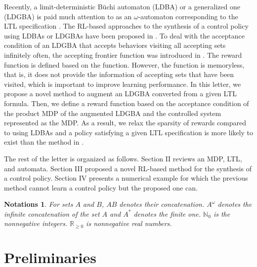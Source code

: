 \documentclass[letterpaper, 10 pt, conference]{ieeeconf}  %
\newtheorem{notations}{Notations}
\begin{document}
Recently, a limit-deterministic B\"{u}chi automaton (LDBA) or a generalized one (LDGBA) is paid much attention to as an $\omega$-automaton corresponding to the LTL specification \cite{SEJK2016}.
The RL-based approaches to the synthesis of a control policy using LDBAs or LDGBAs have been proposed in \cite{HAK2019,Hahn2019,HKAKPL2019,BWZP2019}.
To deal with the acceptance condition of an LDGBA that accepts behaviors visiting all accepting sets infinitely often, the accepting frontier function was introduced in \cite{HAK2019,HKAKPL2019}. The reward function is defined based on the function.
However, the function is memoryless, that is, it does not provide the information of accepting sets that have been visited, which is important to improve learning performance.
In this letter, we propose a novel method to augment an LDGBA converted from a given LTL formula.
Then, we define a reward function based on the acceptance condition of the product MDP of the augmented LDGBA and the controlled system represented as the MDP.
As a result, we relax the sparsity of rewards compared to using LDBAs and a policy satisfying a given LTL specification is more likely to exist than the method in \cite{HAK2019}.

The rest of the letter is organized as follows.
Section II reviews an MDP, LTL, and automata.
Section III proposed a novel RL-based method for the synthesis of a control policy.
Section IV presents a numerical example for which the previous method cannot learn a control policy but the proposed one can.

\begin{notations}
  For sets $A$ and $B$, $AB$ denotes their concatenation. $A^{\omega}$ denotes the infinite concatenation of the set $A$ and $A^{\ast}$ denotes the finite one. $\mathbb{N}_0$ is the nonnegative integers. $\mathbb{R}_{\geq 0}$ is nonnegative real numbers.
\end{notations}

\section{Preliminaries}
\end{document}
